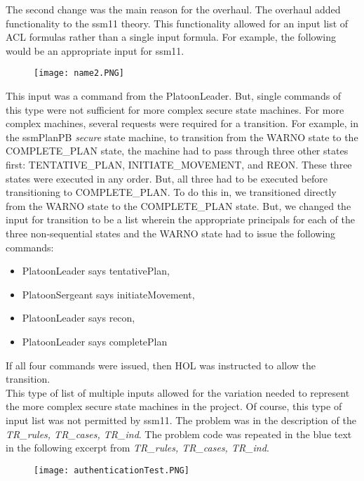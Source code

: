  The second change was the main reason for the overhaul.  The overhaul added functionality
  to the ssm11 theory.  This functionality allowed for an input list of ACL formulas rather than a
  single input formula.  For example, the following would be an appropriate input for ssm11.\\
  
  \begin{figure}[h]
  \centering
  \texttt{[image: name2.PNG]}
\end{figure}

 This input was a command from the PlatoonLeader.  But, single commands of this type were not
  sufficient for more complex secure state machines.  For more complex machines, several requests were
  required for a transition.  For example, in the ssmPlanPB \textit{secure} state machine, to transition
  from the WARNO state to the COMPLETE_PLAN state, the machine had to pass through three other states
  first: TENTATIVE_PLAN, INITIATE_MOVEMENT, and REON.  These three states were executed in any order.
  But, all three had to be executed before transitioning to COMPLETE_PLAN.  To do this in, we
  transitioned directly from the WARNO state to the COMPLETE_PLAN state.  But, we changed the input
  for transition to be a list wherein the appropriate principals for each of the three non-sequential
  states and the WARNO state had to issue the following commands:
  \begin{itemize}
  \item PlatoonLeader says tentativePlan,
   \item  PlatoonSergeant says initiateMovement, 
   \item PlatoonLeader says recon, 
   \item PlatoonLeader says completePlan
   \end{itemize}
   If all four commands were issued, then HOL was instructed to allow the transition. \\
   
    This type of list of multiple inputs allowed for the variation needed to represent the
     more complex secure state machines in the project.  Of course, this type of input list was not
     permitted by ssm11.  The problem was in the description of the \textit{TR_rules, TR_cases, TR_ind}.
     The problem code was repeated in the blue text in the following excerpt from \textit{TR_rules, TR_cases, TR_ind}.\\
     
\begin{figure}[h]
  \centering
  \texttt{[image: authenticationTest.PNG]}
\end{figure}

